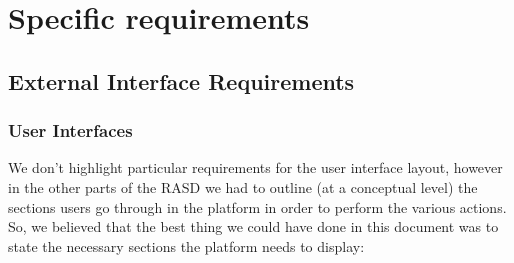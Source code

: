 \chapter{Specific requirements}
	\section{External Interface Requirements}
		\subsection{User Interfaces}
		We don't highlight particular requirements for the user interface layout, however in the other parts of the RASD we had to outline (at a conceptual level) the sections users go through in the platform in order to perform the various actions. So, we believed that the best thing we could have done in this document was to state the necessary sections the platform needs to display:
